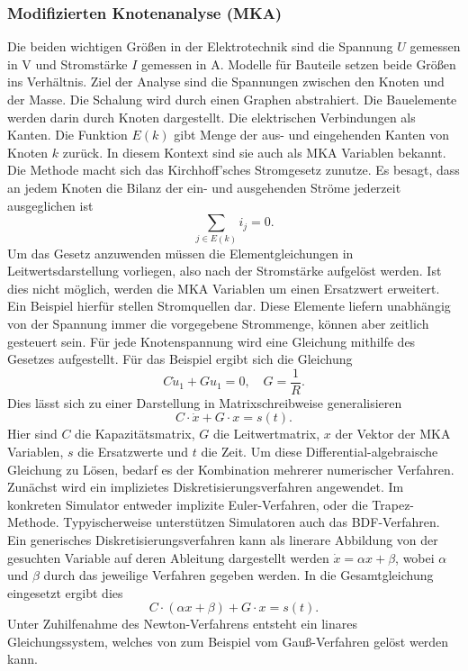\subsubsection*{Modifizierten Knotenanalyse (MKA)}
Die beiden wichtigen Größen in der Elektrotechnik sind die Spannung $U$ gemessen in V und Stromstärke $I$ gemessen in A. Modelle für Bauteile setzen beide Größen ins Verhältnis. Ziel der Analyse sind die Spannungen zwischen den Knoten und der Masse. Die Schalung wird durch einen Graphen abstrahiert. Die Bauelemente werden darin durch Knoten dargestellt. Die elektrischen Verbindungen als Kanten. Die Funktion \(E(k)\) gibt Menge der aus- und eingehenden Kanten von Knoten \(k\) zurück. In diesem Kontext sind sie auch als MKA Variablen bekannt. Die Methode macht sich das Kirchhoff’sches Stromgesetz zunutze. Es besagt, dass an jedem Knoten die Bilanz der ein- und ausgehenden Ströme jederzeit ausgeglichen ist
\begin{displaymath}
    \sum_{j \in E(k)} i_{j} = 0.
\end{displaymath}
Um das Gesetz anzuwenden müssen die Elementgleichungen in Leitwertsdarstellung vorliegen, also nach der Stromstärke aufgelöst werden. Ist dies nicht möglich, werden die MKA Variablen um einen Ersatzwert erweitert. Ein Beispiel hierfür stellen Stromquellen dar. Diese Elemente liefern unabhängig von der Spannung immer die vorgegebene Strommenge, können aber zeitlich gesteuert sein. Für jede Knotenspannung wird eine Gleichung mithilfe des Gesetzes aufgestellt. Für das Beispiel ergibt sich die Gleichung
\begin{displaymath}
    C\dot{u}_1 + Gu_1 = 0,\quad G=\frac{1}{R}.
\end{displaymath}
Dies lässt sich zu einer Darstellung in Matrixschreibweise generalisieren
\begin{displaymath}
    C \cdot \dot{x} + G \cdot x = s(t).
\end{displaymath}
Hier sind $C$ die Kapazitätsmatrix, $G$ die Leitwertmatrix, $x$ der Vektor der MKA Variablen, $s$ die Ersatzwerte und $t$ die Zeit. Um diese Differential-algebraische Gleichung zu Lösen, bedarf es der Kombination mehrerer numerischer Verfahren. Zunächst wird ein implizietes Diskretisierungsverfahren angewendet. Im konkreten Simulator entweder implizite Euler-Verfahren, oder die Trapez-Methode. Typyischerweise unterstützen Simulatoren auch das BDF-Verfahren. Ein generisches Diskretisierungsverfahren kann als linerare Abbildung von der gesuchten Variable auf deren Ableitung dargestellt werden \(\dot{x} = \alpha x + \beta\), wobei \(\alpha\) und \(\beta\) durch das jeweilige Verfahren gegeben werden. In die Gesamtgleichung eingesetzt ergibt dies
\begin{displaymath}
    C \cdot (\alpha x + \beta) + G \cdot x = s(t).
\end{displaymath}
Unter Zuhilfenahme des Newton-Verfahrens entsteht ein linares Gleichungssystem, welches von zum Beispiel vom Gauß-Verfahren gelöst werden kann.